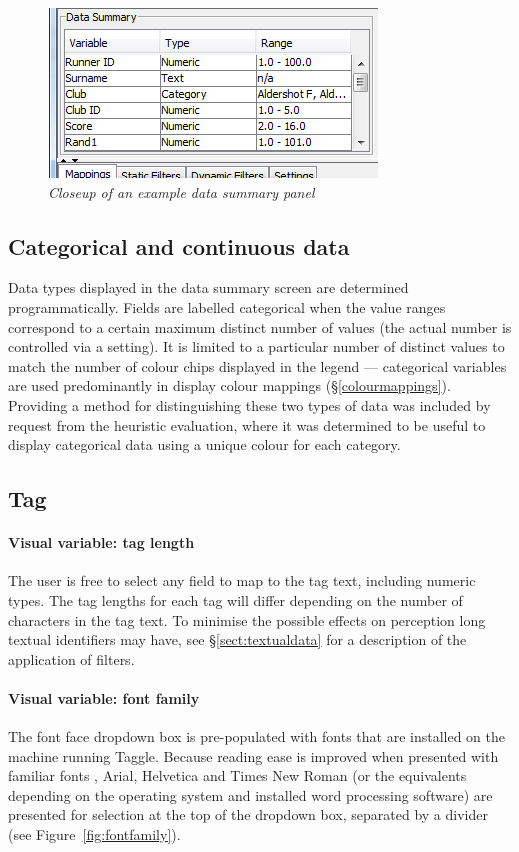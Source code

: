 \begin{figure}[!htb]
  	\centering
   	\includegraphics[scale=0.80]{datasummary2.png}
  	\caption{\textit{Closeup of an example data summary panel}}
	\label{fig:datasummary}
\end{figure}

\subsection{Categorical and continuous data}

Data types displayed in the data summary screen are determined programmatically. Fields are labelled categorical when the value ranges correspond to a certain maximum distinct number of values (the actual number is controlled via a setting). It is limited to a particular number of distinct values to match the number of colour chips displayed in the legend --- categorical variables are used predominantly in display colour mappings (\S\ref{colourmappings}). Providing a method for distinguishing these two types of data was included by request from the heuristic evaluation, where it was determined to be useful to display categorical data using a unique colour for each category.

\subsection{Tag}

\paragraph{Visual variable: tag length} The user is free to select any field to map to the tag text, including numeric types. The tag lengths for each tag will differ depending on the number of characters in the tag text. To minimise the possible effects on perception long textual identifiers may have, see \S\ref{sect:textualdata} for a description of the application of filters.

\paragraph{Visual variable: font family} The font face dropdown box is pre-populated with fonts that are installed on the machine running Taggle. Because reading ease is improved when presented with familiar fonts \citep[pg 106, chap 11:7][]{usability06}, Arial, Helvetica and Times New Roman (or the equivalents depending on the operating system and installed word processing software) are presented for selection at the top of the dropdown box, separated by a divider (see Figure~\vref{fig:fontfamily}).


